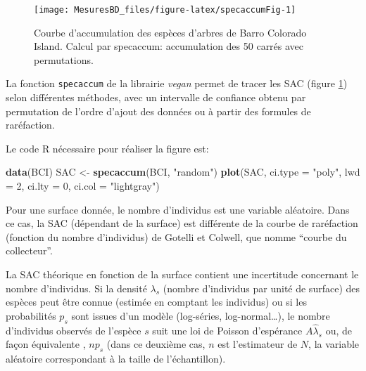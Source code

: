 \documentclass[
  11pt,
  french,
  a4paper,
  extrafontsizes,onecolumn,openright
  ]{memoir}
\newenvironment{Shaded}{\begin{snugshade}}{\end{snugshade}}
\newcommand{\DataTypeTok}[1]{\textcolor[rgb]{0.13,0.29,0.53}{#1}}
\newcommand{\DecValTok}[1]{\textcolor[rgb]{0.00,0.00,0.81}{#1}}
\newcommand{\KeywordTok}[1]{\textcolor[rgb]{0.13,0.29,0.53}{\textbf{#1}}}
\newcommand{\NormalTok}[1]{#1}
\newcommand{\StringTok}[1]{\textcolor[rgb]{0.31,0.60,0.02}{#1}}
\newlength{\rf}
\begin{document}
\scriptsize

\begin{figure}

{\centering \texttt{[image: MesuresBD\_files/figure-latex/specaccumFig-1]} 

}

\caption{Courbe d'accumulation des espèces d'arbres de Barro Colorado Island. Calcul par specaccum: accumulation des 50 carrés avec permutations.}\label{fig:specaccumFig}
\end{figure}

\normalsize

La fonction \texttt{specaccum} de la librairie \emph{vegan} \autocite{Oksanen2012} permet de tracer les SAC (figure \ref{fig:specaccumFig}) selon différentes méthodes, avec un intervalle de confiance obtenu par permutation de l'ordre d'ajout des données ou à partir des formules de raréfaction.

Le code R nécessaire pour réaliser la figure est:

\scriptsize

\begin{Shaded}
\begin{Highlighting}[]
\KeywordTok{data}\NormalTok{(BCI)}
\NormalTok{SAC <-}\StringTok{ }\KeywordTok{specaccum}\NormalTok{(BCI, }\StringTok{"random"}\NormalTok{)}
\KeywordTok{plot}\NormalTok{(SAC, }\DataTypeTok{ci.type =} \StringTok{"poly"}\NormalTok{, }\DataTypeTok{lwd =} \DecValTok{2}\NormalTok{, }\DataTypeTok{ci.lty =} \DecValTok{0}\NormalTok{, }\DataTypeTok{ci.col =} \StringTok{"lightgray"}\NormalTok{)}
\end{Highlighting}
\end{Shaded}

\normalsize

Pour une surface donnée, le nombre d'individus est une variable aléatoire.
Dans ce cas, la SAC (dépendant de la surface) est différente de la courbe de raréfaction (fonction du nombre d'individus) de Gotelli et Colwell, que \textcite{Coleman1981} nomme \enquote{courbe du collecteur}.

La SAC théorique en fonction de la surface contient une incertitude concernant le nombre d'individus.
Si la densité \(\lambda_s\) (nombre d'individus par unité de surface) des espèces peut être connue (estimée en comptant les individus) ou si les probabilités \(p_s\) sont issues d'un modèle (log-séries, log-normal\ldots), le nombre d'individus observés de l'espèce \(s\) suit une loi de Poisson d'espérance \(A\hat{\lambda}_s\) ou, de façon équivalente \autocite[pages 204-205]{Pielou1969}, \(np_s\) (dans ce deuxième cas, \(n\) est l'estimateur de \(N\), la variable aléatoire correspondant à la taille de l'échantillon).
\end{document}
